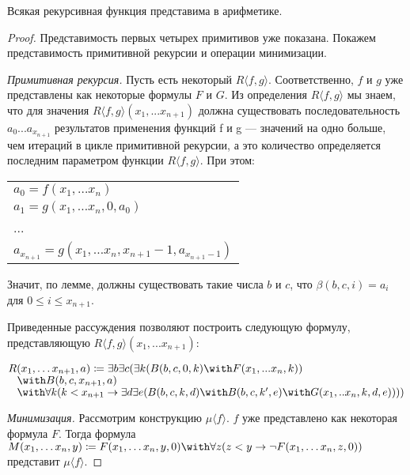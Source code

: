 \begin{theorem}Всякая рекурсивная функция представима в арифметике.\end{theorem}
\begin{proof}
Представимость первых четырех примитивов уже показана. Покажем представимость примитивной рекурсии и 
операции минимизации.

\emph{Примитивная рекурсия.} Пусть есть некоторый $R \langle{} f,g \rangle$. Соответственно, $f$ и $g$ уже 
представлены как некоторые формулы $F$ и $G$. Из определения $R\langle{}f,g\rangle$ мы знаем,
что для значения $R \langle{} f,g \rangle (x_1,...x_{n+1})$ должна существовать последовательность
$a_0 ... a_{x_{n+1}}$ результатов применения функций f и g --- значений на одно больше, чем 
итераций в цикле примитивной рекурсии,
а это количество определяется последним параметром функции $R \langle{}f,g\rangle$. При этом:

\begin{tabular}{l}
$a_0 = f(x_1, \dots x_n)$\\
$a_1 = g(x_1, \dots x_n,0,a_0)$\\
...\\
$a_{x_{n+1}} = g(x_1, \dots x_n, x_{n+1}-1,a_{x_{n+1}-1})$
\end{tabular}

Значит, по лемме, должны существовать такие числа $b$ и $c$, что
$\beta (b,c,i) = a_i$ для $0 \le i \le x_{n+1}$.

Приведенные рассуждения позволяют построить следующую формулу, представляющую $R\langle{}f,g\rangle (x_1, ... x_{n+1})$:

\begin{center}
$R(x_1, \dots x_{n+1}, a) \coloneqq  \exists b \exists c (\exists k (B (b,c,0,k) \with F (x_1,...x_n, k))$\\
       $\;\;\;\with B (b,c,x_{n+1},a)$\\
       $\;\;\;\with \forall k (k < x_{n+1} \rightarrow \exists d \exists e (B (b,c,k,d) \with B (b,c,k',e) \with
           G (x_1,..x_n,k,d,e))))$
\end{center}

\emph{Минимизация.} Рассмотрим конструкцию $\mu\langle{}f\rangle$. $f$ уже представлено 
как некоторая формула $F$. Тогда формула 
$M (x_1, \dots x_n,y) \coloneqq  F(x_1, \dots x_n,y,0) \with \forall z (z < y \rightarrow \neg F (x_1, \dots x_n,z,0))$
представит $\mu\langle{}f\rangle$.
\end{proof}

